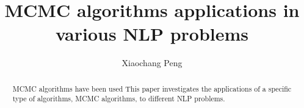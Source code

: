 \documentclass[12pt,leqno]{report}
\begin{document}
\begin{CJK}{UTF8}{cyberbit}

\title{MCMC algorithms applications in various NLP problems}
\author{Xiaochang Peng}


\maketitle

\thispagestyle{empty}
\newenvironment{dedication}
{\cleardoublepage \thispagestyle{empty} \vspace*{\stretch{1}}
  \begin{center} \em}
  {\end{center} \vspace*{\stretch{3}} }

\begin{abstract}
MCMC algorithms have been used
This paper investigates the applications of a specific type of algorithms, MCMC algorithms, to different NLP
problems.

\end{abstract}


\end{CJK}
\end{document}
